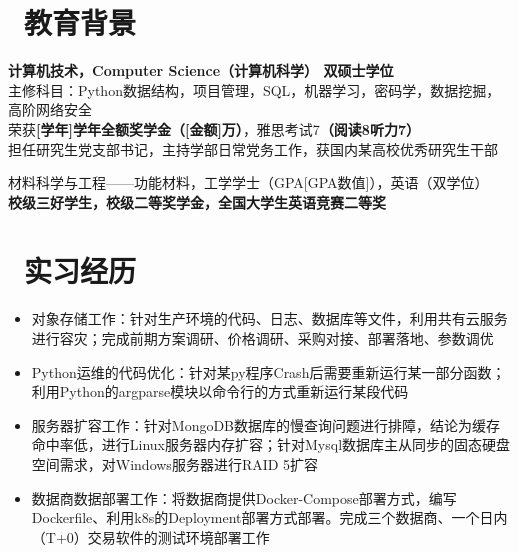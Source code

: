 \documentclass{resume}
\begin{document}
\pagestyle{empty}
\name{[姓名]}
\basicInfo{
    \email{[邮箱]} \textperiodcentered\ 
    \phone{[手机号]} \textperiodcentered\ 
    \text{[出生年份]年[出生月份]生}
  }

\section{\faGraduationCap\ 教育背景}
\textbf{计算机技术，Computer Science（计算机科学） 双硕士学位} \\
主修科目：Python数据结构，项目管理，SQL，机器学习，密码学，数据挖掘，高阶网络安全 \\
荣获\textbf{[学年]学年全额奖学金（[金额]万）}，雅思考试7\textbf{（阅读8听力7）} \\
担任研究生党支部书记，主持学部日常党务工作，获国内某高校优秀研究生干部

材料科学与工程——功能材料，工学学士（GPA[GPA数值]），英语（双学位） \\
\textbf{校级三好学生，校级二等奖学金，全国大学生英语竞赛二等奖}

\section{\faUsers\ 实习经历}
\begin{itemize}
  \item 对象存储工作：针对生产环境的代码、日志、数据库等文件，利用共有云服务进行容灾；完成前期方案调研、价格调研、采购对接、部署落地、参数调优
  \item Python运维的代码优化：针对某py程序Crash后需要重新运行某一部分函数；利用Python的argparse模块以命令行的方式重新运行某段代码
  \item 服务器扩容工作：针对MongoDB数据库的慢查询问题进行排障，结论为缓存命中率低，进行Linux服务器内存扩容；针对Mysql数据库主从同步的固态硬盘空间需求，对Windows服务器进行RAID 5扩容
  \item 数据商数据部署工作：将数据商提供Docker-Compose部署方式，编写Dockerfile、利用k8s的Deployment部署方式部署。完成三个数据商、一个日内（T+0）交易软件的测试环境部署工作
\end{itemize}
\end{document}
